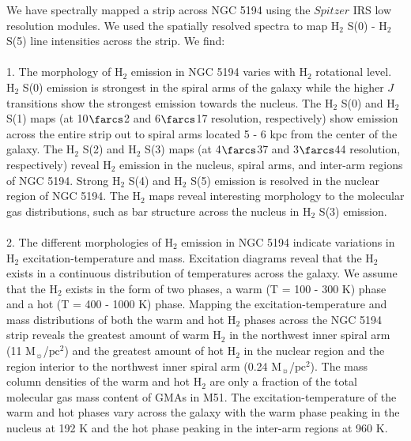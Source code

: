 \documentclass[manuscript]{aastex}
\begin{document}
We have spectrally mapped a strip across NGC 5194 using the $Spitzer$ IRS low resolution modules.  We used the spatially resolved spectra to map $\mathrm{H_2}$ S(0) - $\mathrm{H_2}$ S(5) line intensities across the strip.  We find:\\
\\
1.  The morphology of $\mathrm{H_2}$ emission in NGC 5194 varies with $\mathrm{H_2}$ rotational level.  $\mathrm{H_2}$ S(0) emission is strongest in the spiral arms of the galaxy while the higher $J$ transitions show the strongest emission towards the nucleus.  The $\mathrm{H_2}$ S(0) and $\mathrm{H_2}$ S(1) maps (at 10$\farcs$2 and 6$\farcs$17 resolution, respectively) show emission across the entire strip out to spiral arms located 5 - 6 kpc from the center of the galaxy.  The $\mathrm{H_2}$ S(2) and $\mathrm{H_2}$ S(3) maps (at 4$\farcs$37 and 3$\farcs$44 resolution, respectively) reveal $\mathrm{H_2}$ emission in the nucleus, spiral arms, and inter-arm regions of NGC 5194.  Strong $\mathrm{H_2}$ S(4) and $\mathrm{H_2}$ S(5) emission is resolved in the nuclear region of NGC 5194.  The $\mathrm{H_2}$ maps reveal interesting morphology to the molecular gas distributions, such as bar structure across the nucleus in $\mathrm{H_2}$ S(3) emission.\\
\\
2.  The different morphologies of  $\mathrm{H_2}$ emission in NGC 5194 indicate variations in $\mathrm{H_2}$ excitation-temperature and mass.  Excitation diagrams reveal that the $\mathrm{H_2}$ exists in a continuous distribution of temperatures across the galaxy.  We assume that the $\mathrm{H_2}$ exists in the form of two phases, a warm (T = 100 - 300 K) phase and a hot (T = 400 - 1000 K) phase.  Mapping the excitation-temperature and mass distributions of both the warm and hot $\mathrm{H_2}$ phases across the NGC 5194 strip reveals the greatest amount of warm $\mathrm{H_2}$ in the northwest inner spiral arm (11 $\mathrm{M_\sun}$/$\mathrm{pc^2}$) and the greatest amount of hot $\mathrm{H_2}$ in the nuclear region and  the region interior to the northwest inner spiral arm (0.24 $\mathrm{M_\sun}$/$\mathrm{pc^2}$).  The mass column densities of the warm and hot $\mathrm{H_2}$ are only a fraction of the total molecular gas mass content of GMAs in M51.  The excitation-temperature of the warm and hot phases vary across the galaxy with the warm phase peaking in the nucleus at 192 K and the hot phase peaking in the inter-arm regions at 960 K.\\
\\
\end{document}

